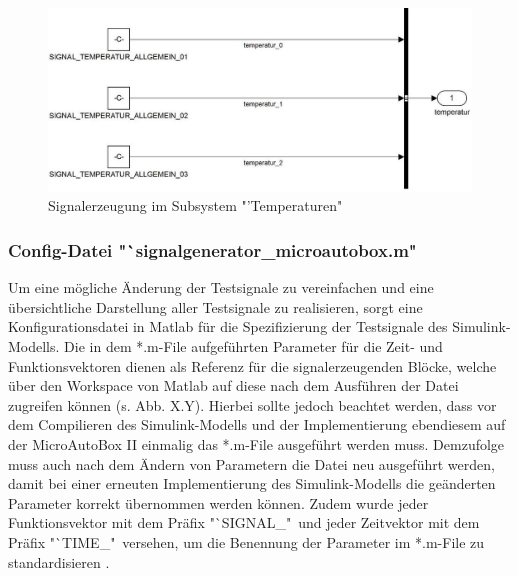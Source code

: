 \documentclass[fontsize = 12pt, paper = a4]{scrreprt}
\begin{document}
\begin{figure}[h]
\centering
\includegraphics[scale = 0.65]{subsubtemp}
\caption{Signalerzeugung im Subsystem "'Temperaturen"}
\end{figure}


\subsubsection{Config-Datei "`signalgenerator\_microautobox.m" }

Um eine mögliche Änderung der Testsignale zu vereinfachen und eine übersichtliche Darstellung aller Testsignale zu realisieren, sorgt eine Konfigurationsdatei in Matlab für die Spezifizierung der Testsignale des Simulink-Modells. Die in dem *.m-File aufgeführten Parameter für die Zeit- und Funktionsvektoren dienen als Referenz für die signalerzeugenden Blöcke, welche über den Workspace von Matlab auf diese nach dem Ausführen der Datei zugreifen können (s. Abb. X.Y). Hierbei sollte jedoch beachtet werden, dass vor dem Compilieren des Simulink-Modells und der Implementierung ebendiesem auf der MicroAutoBox II einmalig das *.m-File ausgeführt werden muss. Demzufolge muss auch nach dem Ändern von Parametern die Datei neu ausgeführt werden, damit bei einer erneuten Implementierung des Simulink-Modells die geänderten Parameter korrekt übernommen werden können. Zudem wurde jeder Funktionsvektor mit dem Präfix "`SIGNAL\_"\ und jeder Zeitvektor mit dem Präfix "`TIME\_"\ versehen, um die Benennung der Parameter im *.m-File zu standardisieren . 
\end{document}
